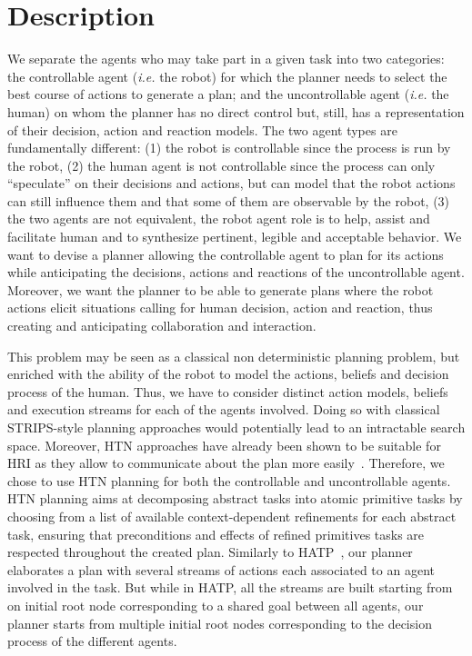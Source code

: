 \documentclass[a4paper,11pt,twoside]{StyleThese}
\begin{document}
\section{Description}
We separate the agents who may take part in a given task into two categories: the controllable agent (\textit{i.e.} the robot) for which the planner needs to select the best course of actions to generate a plan; and the uncontrollable agent (\textit{i.e.} the human) on whom the planner has no direct control but, still, has a representation of their decision, action and reaction models. The two agent types are fundamentally different: (1) the robot is controllable since the process is run by the robot, (2) the human agent is not controllable since the process can only ``speculate'' on their decisions and actions, but can model that the robot actions can still influence them and that some of them are observable by the robot, (3) the two agents are not equivalent, the robot agent role is to help, assist and facilitate human and to synthesize pertinent, legible and acceptable behavior.
We want to devise a planner allowing the controllable agent to plan for its actions while anticipating the decisions, actions and reactions of the uncontrollable agent. Moreover, we want the planner to be able to generate plans where the robot actions elicit situations calling for human decision, action and reaction, thus creating and anticipating collaboration and interaction.

\smallskip

This problem may be seen as a classical non deterministic planning problem, but enriched with the ability of the robot to model the actions, beliefs and decision process of the human. Thus, we have to consider distinct action models, beliefs and execution streams for each of the agents involved. Doing so with classical STRIPS-style planning approaches would potentially lead to an intractable search space. Moreover, HTN approaches have already been shown to be suitable for HRI as they allow to communicate about the plan more easily~\cite{lallement2014hatp}. Therefore, we chose to use HTN planning for both the controllable and uncontrollable agents. HTN planning aims at decomposing abstract tasks into atomic primitive tasks by choosing from a list of available context-dependent refinements for each abstract task, ensuring that preconditions and effects of refined primitives tasks are respected throughout the created plan. Similarly to HATP~\cite{sebastiani2017dealing}, our planner elaborates a plan with several streams of actions each associated to an agent involved in the task. But while in HATP, all the streams are built starting from on initial root node corresponding to a shared goal between all agents, our planner starts from multiple initial root nodes corresponding to the decision process of the different agents.
\end{document}
